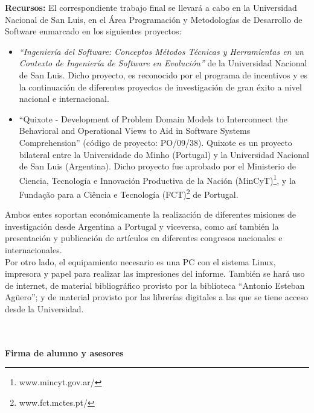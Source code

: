 \documentclass[a4paper,12pt]{report}
\begin{document}
{\large \textbf{Recursos:}}
\vskip0.5cm
\hspace{0.5cm}El correspondiente trabajo final se llevará a cabo en la Universidad Nacional de San Luis, en el Área Programación y Metodologías de Desarrollo de Software enmarcado en los siguientes proyectos:

\begin{itemize}
\itemsep0em%
\item \textit{“Ingeniería del Software: Conceptos Métodos Técnicas y 
Herramientas en un Contexto de Ingeniería de Software en Evolución”} de la Universidad 
Nacional de San Luis. 
Dicho proyecto, es reconocido por el programa de incentivos y es la continuación de 
diferentes proyectos de investigación de gran éxito a nivel nacional e internacional.

\item “Quixote - Development of Problem Domain Models to Interconnect the Behavioral and Operational Views to Aid in Software Systems Comprehension” (código de proyecto: PO/09/38).  Quixote es un proyecto bilateral entre la Universidade do Minho (Portugal) y la Universidad Nacional de San Luis (Argentina). Dicho proyecto fue aprobado por el Ministerio de Ciencia, Tecnología e Innovación Productiva de la Nación (MinCyT)\footnote[1]{www.mincyt.gov.ar/}, y la Fundação para a Ciência e Tecnología (FCT)\footnote[2]{www.fct.mctes.pt/} de Portugal. 

\end{itemize}

\hspace{0.5cm}Ambos entes soportan económicamente la realización de diferentes misiones de investigación desde Argentina a Portugal y viceversa, como así también la presentación y publicación de artículos en diferentes congresos nacionales e internacionales.\\

\hspace{0.5cm}Por otro lado, el equipamiento necesario es una PC con el sistema Linux, impresora y papel para realizar las impresiones del informe. También se hará uso de internet, de material bibliográfico provisto por la biblioteca “Antonio Esteban Agüero”; y  de material provisto por las librerías digitales a las que se tiene acceso desde la Universidad.



\renewcommand{\bibname}{\large \textbf{Bibliografía}}


\nocite{*}%

{\large \textbf{\\\\Firma de alumno y asesores}}
\end{document}
